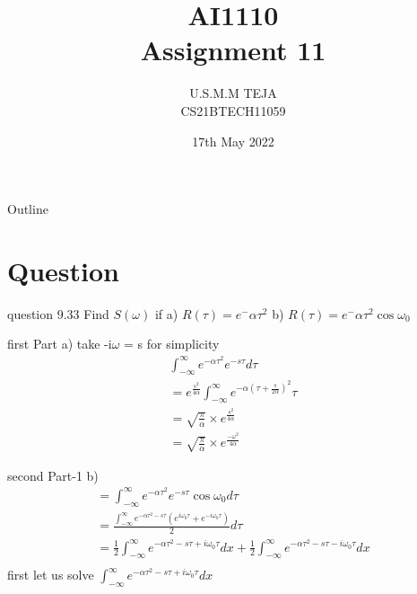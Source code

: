 \documentclass{beamer}
\title{AI1110 \\ Assignment 11}
\author{U.S.M.M TEJA \\ CS21BTECH11059}
\date{17th May 2022}
\begin{document}
	\begin{frame}
		\titlepage
	\end{frame}
	
	\begin{frame}{Outline}
    		\tableofcontents
	\end{frame}
	
	\section{Question}
	\begin{frame}{question 9.33}
Find $S(\omega)$ 
if a)  $R(\tau) = e^-{\alpha{\tau}^2}$
b) $R(\tau) = e^-{\alpha{\tau}^2}\cos{\omega_0}$
	\end{frame}

\begin{frame}{first Part}
a) take -i$\omega$ = s for simplicity
\begin{align}
   &\int_{-\infty}^{\infty} e^{-\alpha{\tau}^2}e^{-s\tau}d\tau &\\
   & = e^{\frac{s^2}{4\alpha}}\int_{-\infty}^{\infty}e^{-\alpha(\tau + \frac{s}{2\alpha})^2}\tau &\\
   & = \sqrt{\frac{\pi}{\alpha}}\times e^{\frac{s^2}{4\alpha}}& \\
   & = \sqrt{\frac{\pi}{\alpha}}\times e^{\frac{-\omega^2}{4\alpha}}&
\end{align}

\end{frame}

    \begin{frame}{second Part-1}
 b) \begin{align}
     & = \int_{-\infty}^{\infty} e^{-\alpha{\tau}^2}e^{-s\tau}\cos{\omega_0}d\tau &\\
       & = \frac{\int_{-\infty}^{\infty} e^{-\alpha{\tau}^2 - s\tau}(e^{i\omega_0\tau} + e^{-i\omega_0\tau})}{2}d\tau & \\
       & =  \frac{1}{2}\int_{-\infty}^{\infty}e^{-\alpha{\tau}^2- s\tau + i\omega_0\tau}dx + \frac{1}{2}\int_{-\infty}^{\infty}e^{-\alpha{\tau}^2- s\tau - i\omega_0\tau}dx& \\
              \end{align}
        first let us solve $\int_{-\infty}^{\infty}e^{-\alpha{\tau}^2- s\tau + i\omega_0\tau}dx $

\end{frame}
\end{document}
